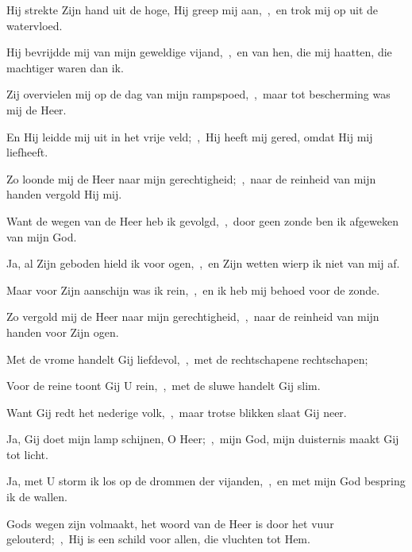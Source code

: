 \documentclass[12pt,twoside,a5paper]{article}
\begin{document}

\begin{halfparskip}
  Hij strekte Zijn hand uit de hoge, Hij greep mij aan,~\sep\ en trok mij op uit de watervloed.

  Hij bevrijdde mij van mijn geweldige vijand,~\sep\ en van hen, die mij haatten, die machtiger waren dan ik.

  Zij overvielen mij op de dag van mijn rampspoed,~\sep\ maar tot bescherming was mij de Heer.

  En Hij leidde mij uit in het vrije veld;~\sep\ Hij heeft mij gered, omdat Hij mij liefheeft.
\end{halfparskip}


\begin{halfparskip}
  Zo loonde mij de Heer naar mijn gerechtigheid;~\sep\ naar de reinheid van mijn handen vergold Hij mij.

  Want de wegen van de Heer heb ik gevolgd,~\sep\ door geen zonde ben ik afgeweken van mijn God.

  Ja, al Zijn geboden hield ik voor ogen,~\sep\ en Zijn wetten wierp ik niet van mij af.

  Maar voor Zijn aanschijn was ik rein,~\sep\ en ik heb mij behoed voor de zonde.

  Zo vergold mij de Heer naar mijn gerechtigheid,~\sep\ naar de reinheid van mijn handen voor Zijn ogen.
\end{halfparskip}


\begin{halfparskip}
  Met de vrome handelt Gij liefdevol,~\sep\ met de rechtschapene rechtschapen;

  Voor de reine toont Gij U rein,~\sep\ met de sluwe handelt Gij slim.

  Want Gij redt het nederige volk,~\sep\ maar trotse blikken slaat Gij neer.

  Ja, Gij doet mijn lamp schijnen, O Heer;~\sep\ mijn God, mijn duisternis maakt Gij tot licht.

  Ja, met U storm ik los op de drommen der vijanden,~\sep\ en met mijn God bespring ik de wallen.

  Gods wegen zijn volmaakt, het woord van de Heer is door het vuur gelouterd;~\sep\ Hij is een schild voor allen, die vluchten tot Hem.
\end{halfparskip}
\end{document}

